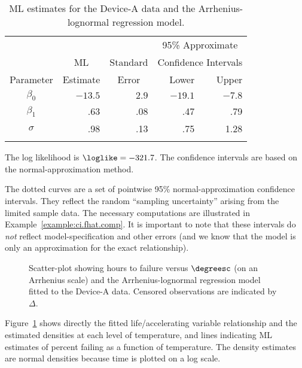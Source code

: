 \begin{example}
\begin{table}
\caption{ML estimates for the Device-A 
data and the Arrhenius-lognormal regression model.}
\centering\small
\begin{tabular}{crrrr}
\\[-.5ex] \hline
 & & & \multicolumn{2}{c}{95\% Approximate}\\
&\multicolumn{1}{c}{ML} &Standard  & \multicolumn{2}{c}{Confidence
Intervals}\\  \cline{4-5}
Parameter &  Estimate & \multicolumn{1}{c}{Error} & Lower & Upper \\
\hline 
 $\beta_{0} $ & $-13.5$ & $2.9$ & $-19.1$ & $-7.8$ \\[.7ex] 
$\beta_{1}$ &.63 &.08 &.47 &.79 \\[.7ex] 
$\sigma$ &.98 &.13 &.75 &1.28\\
\hline
\\[-1.8ex]
\end{tabular}
\begin{minipage}[t]{4in}
The log likelihood is $\loglike= -321.7$. The confidence intervals 
are based on the normal-approximation method.
\end{minipage}
\label{table:deva.arr.lognor.mles}
\end{table} 
The dotted curves are a set of pointwise 95\% normal-approximation
confidence intervals. They reflect the random
``sampling uncertainty'' arising from
the limited sample data. The necessary computations are illustrated in
Example~\ref{example:ci.fhat.comp}. It is important to note that these
intervals do {\em not} reflect model-specification and other
errors (and we know
that the model is only an approximation for the exact relationship).
\begin{figure}
\caption{Scatter-plot showing hours to failure versus
$\degreesc$ (on an Arrhenius scale) and
the Arrhenius-lognormal regression model
fitted to the Device-A data.
Censored observations are indicated by $\Delta$.}
\label{figure:devalt.lnor.altplot.ps}
\end{figure}
Figure~\ref{figure:devalt.lnor.altplot.ps} shows directly the fitted
life/accelerating variable relationship and the estimated densities at
each level of temperature, and lines indicating ML estimates of
percent failing as a function of temperature. The density estimates 
are normal densities because time is plotted on a log scale.
\end{example}

